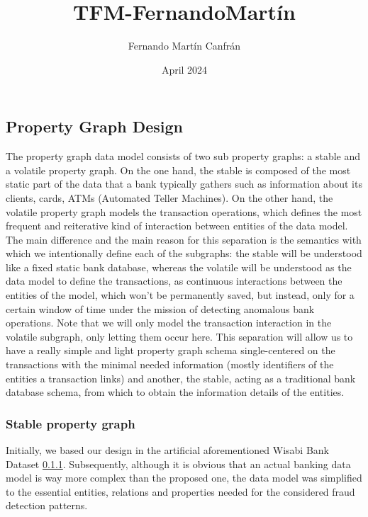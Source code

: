 \documentclass{article}
\title{TFM-FernandoMartín}
\author{Fernando Martín Canfrán}
\date{April 2024}
\begin{document}
\subsection{Property Graph Design}

The property graph data model consists of two sub property graphs: a stable and a volatile property graph. On the one hand, the stable is composed of the most static part of the data that a bank typically gathers such as information about its clients, cards, ATMs (Automated Teller Machines). 
On the other hand, the volatile property graph models the transaction operations, which defines the most frequent and reiterative kind of interaction between entities of the data model.\\
The main difference and the main reason for this separation is the semantics with which we intentionally define each of the subgraphs: the stable will be understood like a fixed static bank database, whereas the volatile will be understood as the data model to define the transactions, as continuous interactions between the entities of the model, which won't be permanently saved, but instead, only for a certain window of time under the mission of detecting anomalous bank operations. Note that we will only model the transaction interaction in the volatile subgraph, only letting them occur here.
This separation will allow us to have a really simple and light property graph schema single-centered on the transactions with the minimal needed information (mostly identifiers of the entities a transaction links) and another, the stable, acting as a traditional bank database schema, from which to obtain the information details of the entities.

\subsubsection{Stable property graph}

Initially, we based our design in the artificial aforementioned Wisabi Bank Dataset \ref{}. Subsequently, although it is obvious that an actual banking data model is way more complex than the proposed one, the data model was simplified to the essential entities, relations and properties needed for the considered fraud detection patterns.

\end{document}
